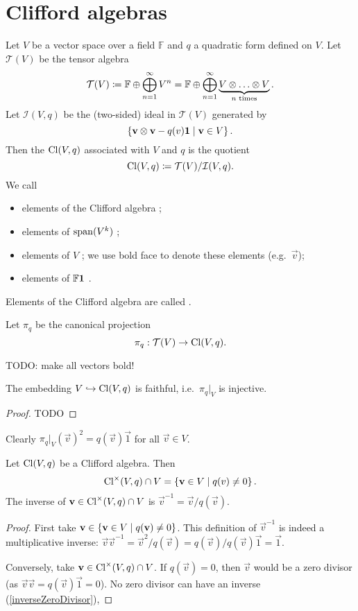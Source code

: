 \section{Clifford algebras}
\begin{definition}
Let $V$ be a vector space over a field $\mathbb{F}$ and $q$ a quadratic form defined on $V$.
Let $\mathcal{T}(V)$ be the tensor algebra
\[ \mathcal{T}(V) \coloneqq \mathbb{F}\oplus \bigoplus_{n=1}^\infty V^n = \mathbb{F}\oplus \bigoplus_{n=1}^\infty \underbrace{V\otimes \ldots \otimes V}_{\text{$n$ times}}. \]
Let $\mathcal{I}(V,q)$ be the (two-sided) ideal in $\mathcal{T}(V)$ generated by
\[ \left\{ \boldsymbol{\mathrm{v}}\otimes \boldsymbol{\mathrm{v}} - q(v) \boldsymbol{\mathrm{1}} \;\middle|\; \boldsymbol{\mathrm{v}}\in V \right\}. \]
Then the  $\operatorname{Cl}(V,q)$ associated with $V$ and $q$ is the quotient
\[ \operatorname{Cl}(V,q) \coloneqq \mathcal{T}(V)/\mathcal{I}(V,q). \]
We call
\begin{itemize}
    \item elements of the Clifford algebra ;
    \item elements of $\operatorname{span}(V^k)$ ;
    \item elements of $V$ ; we use bold face to denote these elements (e.g.\ $\vec{v}$);
    \item elements of $\mathbb{F}\boldsymbol{\mathrm{1}}$ .
\end{itemize}
Elements of the Clifford algebra are called .
\end{definition}
Let $\pi_q$ be the canonical projection
\[ \pi_q: \mathcal{T}(V) \to \operatorname{Cl}(V,q). \]


TODO: make all vectors bold!

\begin{lemma}
The embedding $V\hookrightarrow \operatorname{Cl}(V,q)$ is faithful, i.e.\ $\pi_q|_V$ is injective.
\end{lemma}
\begin{proof}
TODO
\end{proof}
Clearly $\pi_q|_V(\vec{v})^2 = q(\vec{v}) \vec{1}$ for all $\vec{v}\in V$.

\begin{lemma} \label{vectorInverseCliffordAlgebra}
Let $\operatorname{Cl}(V,q)$ be a Clifford algebra. Then
\[ \operatorname{Cl}^\times(V,q) \cap V = \left\{ \boldsymbol{\mathrm{v}}\in V \;\middle|\; q(v) \neq 0 \right\}. \]
The inverse of $\boldsymbol{\mathrm{v}}\in \operatorname{Cl}^\times(V,q) \cap V$ is $\vec{v}^{-1} = \vec{v}/q(\vec{v})$.
\end{lemma}
\begin{proof}
First take $\boldsymbol{\mathrm{v}}\in \left\{ \boldsymbol{\mathrm{v}}\in V \;\middle|\; q(\boldsymbol{\mathrm{v}}) \neq 0 \right\}$. This definition of $\vec{v}^{-1}$ is indeed a multiplicative inverse: $\vec{v}\vec{v}^{-1} = \vec{v}^2/q(\vec{v}) = q(\vec{v})/q(\vec{v})\vec{1} = \vec{1}$.

Conversely, take $\boldsymbol{\mathrm{v}}\in \operatorname{Cl}^\times(V,q) \cap V$. If $q(\vec{v}) = 0$, then $\vec{v}$ would be a zero divisor (as $\vec{v}\vec{v} = q(\vec{v})\vec{1} = 0$). No zero divisor can have an inverse (\ref{inverseZeroDivisor}), 
\end{proof}


